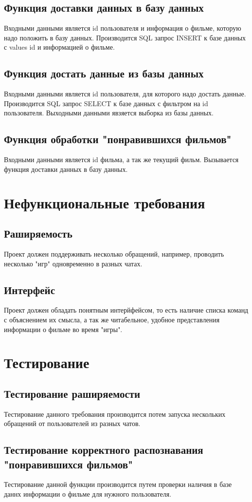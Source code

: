 \documentclass{article}
\begin{document}
\subsection{Функция доставки данных в базу данных}
Входными данными является id пользователя и информация о фильме, которую надо положить в базу данных. Производится SQL запрос INSERT к базе данных с values id и информацией о фильме.

\subsection{Функция достать данные из базы данных}
Входными данными является id пользователя, для которого надо достать данные. Производится SQL запрос SELECT к базе данных с фильтром на id пользователя. Выходными данными явзяется выборка из базы данных.

\subsection{Функция обработки "понравившихся фильмов"}
Входными данными является id фильма, а так же текущий фильм. Вызывается функция доставки данных в базу данных.

\section{Нефункциональные требования}

\subsection{Раширяемость} 

    Проект должен поддерживать несколько обращений, например, проводить несколько "игр" одновременно в разных чатах.
\subsection{Интерфейс}
    Проект должен обладать понятным интерйфейсом, то есть наличие списка команд с объяснением их смысла, а так же читабельное, удобное представления информации о фильме во время "игры".
    
        

\section{Тестирование}

\subsection{Тестирование раширяемости}
Тестирование данного требования производится потем запуска нескольких обращений от пользователей из разных чатов.

\subsection{Тестирование корректного распознавания "понравившихся фильмов"}

Тестирование данной функции производится путем проверки наличия в базе даннх информации о фильме для нужного пользователя.
\end{document}
